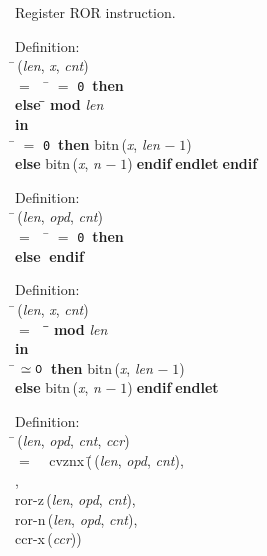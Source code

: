  Register ROR instruction.
\begin{tabbing}{\sc Definition}: \\  
\=\,({\it{len\/}}, {\it{x\/}}, {\it{cnt\/}}) \\ 
$=$$\;\;\;\;$\= $=$ {\tt{0}}$\;\;${\bf then }{} \\ 
{\bf else }\=\= ${}${\bf{mod}}${}$ {\it{len\/}}\- \\ 
{\bf in} \\ 
\= $=$ {\tt{0}}$\;\;${\bf then }{\rm{bitn}}\,({\it{x\/}}, {\it{len\/}} $-\;1$) \\ 
{\bf else }{\rm{bitn}}\,({\it{x\/}}, {\it{n\/}} $-\;1$)$\;${\bf  endif}\-$\;${\bf  endlet}\-$\;${\bf  endif}\-\-
\end{tabbing}

\begin{tabbing}{\sc Definition}: \\  
\=\,({\it{len\/}}, {\it{opd\/}}, {\it{cnt\/}}) \\ 
$=$$\;\;\;\;$\= $=$ {\tt{0}}$\;\;${\bf then }{} \\ 
{\bf else }{}$\;${\bf  endif}\-\-
\end{tabbing}

\begin{tabbing}{\sc Definition}: \\  
\=\,({\it{len\/}}, {\it{x\/}}, {\it{cnt\/}}) \\ 
$=$$\;\;\;\;$\=\= ${}${\bf{mod}}${}$ {\it{len\/}}\- \\ 
{\bf in} \\ 
\= $\simeq {\tt{0}}$$\;\;${\bf then }{\rm{bitn}}\,({\it{x\/}}, {\it{len\/}} $-\;1$) \\ 
{\bf else }{\rm{bitn}}\,({\it{x\/}}, {\it{n\/}} $-\;1$)$\;${\bf  endif}\-$\;${\bf  endlet}\-\-
\end{tabbing}

\begin{tabbing}{\sc Definition}: \\  
\=\,({\it{len\/}}, {\it{opd\/}}, {\it{cnt\/}}, {\it{ccr\/}}) \\ 
$=$$\;\;\;\;${\rm{cvznx}}\,(\=\,({\it{len\/}}, {\it{opd\/}}, {\it{cnt\/}}), \\ 
{}, \\ 
{\rm{ror-z}}\,({\it{len\/}}, {\it{opd\/}}, {\it{cnt\/}}), \\ 
{\rm{ror-n}}\,({\it{len\/}}, {\it{opd\/}}, {\it{cnt\/}}), \\ 
{\rm{ccr-x}}\,({\it{ccr\/}}))\-\-
\end{tabbing}

